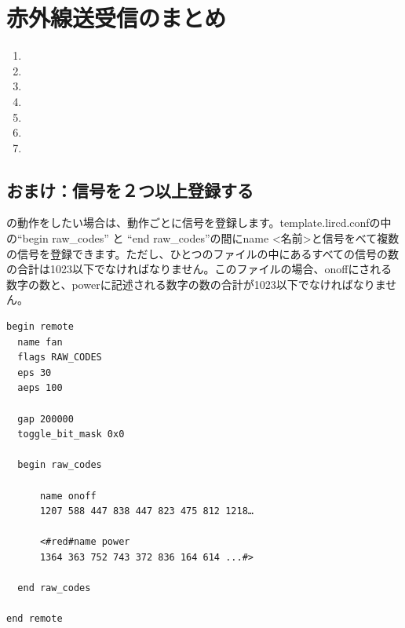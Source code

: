 \newpage
\section{赤外線送受信のまとめ}
\begin{enumerate}
\item {}
\item {}
\item {}
\item {}
\item {}
\item {}
\item {}
\end{enumerate}

\begin{tcolorbox}[title=\useOmetoi]
\begin{enumerate}
\end{enumerate}
\end{tcolorbox}

\newpage
\subsection{おまけ：信号を２つ以上登録する}
の動作をしたい場合は、動作ごとに信号を登録します。template.lircd.confの中の“begin raw\_codes” と “end raw\_codes”の間にname <名前>と信号をべて複数の信号を登録できます。ただし、ひとつのファイルの中にあるすべての信号の数の合計は1023以下でなければなりません。このファイルの場合、onoffにされる数字の数と、powerに記述される数字の数の合計が1023以下でなければなりません。\\

\begin{lstlisting}[caption=２つの信号を登録するときのtemplate.lircd.comf,label=２つの信号を登録するときのtemplate.lircd.comf]
begin remote
  name fan
  flags RAW_CODES
  eps 30
  aeps 100

  gap 200000
  toggle_bit_mask 0x0

  begin raw_codes

      name onoff
      1207 588 447 838 447 823 475 812 1218…

      <#red#name power
      1364 363 752 743 372 836 164 614 ...#>

  end raw_codes

end remote
\end{lstlisting}

